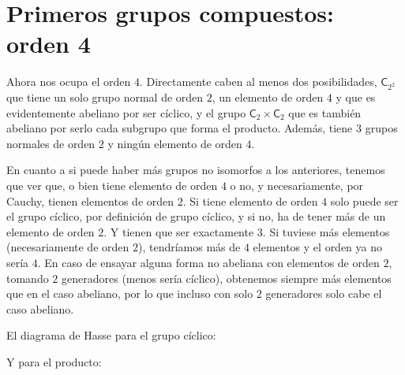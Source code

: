 \documentclass[12pt,a4paper,fleqn,spanish,final,openright]{extbook}
\theoremstyle{definition}
\theoremstyle{remark}
\begin{document}
\chapter{Primeros grupos compuestos: orden 4}

Ahora nos ocupa el orden $4$. Directamente caben al menos dos posibilidades, $\textsf{C}_{2^2}$ que tiene un solo grupo normal de orden $2$, un elemento de orden $4$ y que es evidentemente abeliano por ser cíclico, y el grupo $\textsf{C}_{2}  \times  \textsf{C}_{2}$ que es también abeliano por serlo cada subgrupo que forma el producto. Además, tiene $3$ grupos normales de orden $2$ y ningún elemento de orden $4$.

En cuanto a si puede haber más grupos no isomorfos a los anteriores, tenemos que ver que, o bien tiene elemento de orden $4$ o no, y necesariamente, por Cauchy, tienen elementos de orden $2$. Si tiene elemento de orden $4$ solo puede ser el grupo cíclico, por definición de grupo cíclico, y si no, ha de tener más de un elemento de orden $2$. Y tienen que ser exactamente $3$. Si tuviese más elementos (necesariamente de orden $2$), tendríamos más de $4$ elementos y el orden ya no sería $4$. En caso de ensayar alguna forma no abeliana con elementos de orden $2$, tomando $2$ generadores (menos sería cíclico), obtenemos siempre más elementos que en el caso abeliano, por lo que incluso con solo $2$ generadores solo cabe el caso abeliano.

El diagrama de Hasse para el grupo cíclico:

\begin{center}
\end{center}

Y para el producto:
\end{document}
